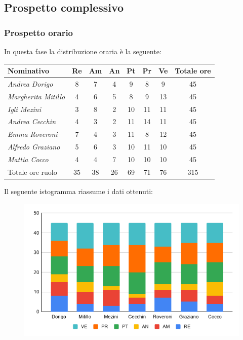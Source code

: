 {{{{{{{{{{{{{{{		\subsection{Prospetto complessivo}\label{PreventivoFaseDiProgettazioneDiDettaglioECodificaComplessivo}
	
			\subsubsection{Prospetto orario}\label{PreventivoFaseDiProgettazioneDiDettaglioECodificaProspettoOrario}
			In questa fase la distribuzione oraria è la seguente:
			\quad
			\def\tabularxcolumn#1{m{#1}}
			{
				
				\begin{center}
					\renewcommand{\arraystretch}{1.4}
					\begin{tabularx}{\textwidth}{|X|c|c|c|c|c|c|c|}
						\hline
						\rowcolor{airforceblue}
						\textbf{Nominativo} & \textbf{Re} & \textbf{Am} & \textbf{An} & \textbf{Pt} & \textbf{Pr} & \textbf{Ve} & \textbf{Totale ore}\\
						\hline
						\textit{Andrea Dorigo} & 8 & 7 & 4 & 9 & 8 & 9 & 45\\
						\hline
						\textit{Margherita Mitillo} & 4 & 6 & 5 & 8 & 9 & 13 & 45\\
						\hline
						\textit{Igli Mezini} & 3 & 8 & 2 & 10 & 11 & 11 & 45\\
						\hline
						\textit{Andrea Cecchin} & 4 & 3 & 2 & 11 & 14 & 11 & 45\\
						\hline
						\textit{Emma Roveroni} & 7 & 4 & 3 & 11 & 8 & 12 & 45\\
						\hline
						\textit{Alfredo Graziano} & 5 & 6 & 3 & 10 & 11 & 10 & 45\\
						\hline
						\textit{Mattia Cocco} & 4 & 4 & 7 & 10 & 10 & 10 & 45\\
						\hline
						Totale ore ruolo & 35 & 38 & 26 & 69 & 71 & 76 & 315\\
						\hline
					\end{tabularx}
				\end{center}
				Il seguente istogramma riassume i dati ottenuti:
				\begin{figure}[!h]
					\begin{center}
						\includegraphics[width=0.7\linewidth]{../immagini/pdp/istogramma_progettazione_dettaglio.png}

\end{center}
\end{figure}}}}}}}}}}}}}}}}}
